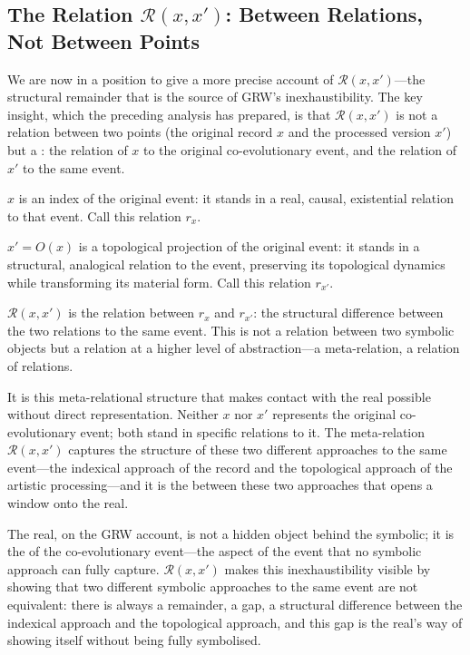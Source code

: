 \subsection{The Relation $\mathcal{R}(x, x')$: Between Relations, Not Between Points}
\label{p15:subsec:relation}

\noindent
We are now in a position to give a more precise account of $\mathcal{R}(x, x')$---the structural remainder that is the source of GRW's inexhaustibility. The key insight, which the preceding analysis has prepared, is that $\mathcal{R}(x, x')$ is not a relation between two points (the original record $x$ and the processed version $x'$) but a : the relation of $x$ to the original co-evolutionary event, and the relation of $x'$ to the same event.

$x$ is an index of the original event: it stands in a real, causal, existential relation to that event. Call this relation $r_x$.

$x' = O(x)$ is a topological projection of the original event: it stands in a structural, analogical relation to the event, preserving its topological dynamics while transforming its material form. Call this relation $r_{x'}$.

$\mathcal{R}(x, x')$ is the relation between $r_x$ and $r_{x'}$: the structural difference between the two relations to the same event. This is not a relation between two symbolic objects but a relation at a higher level of abstraction---a meta-relation, a relation of relations.

It is this meta-relational structure that makes contact with the real possible without direct representation. Neither $x$ nor $x'$ represents the original co-evolutionary event; both stand in specific relations to it. The meta-relation $\mathcal{R}(x, x')$ captures the structure of these two different approaches to the same event---the indexical approach of the record and the topological approach of the artistic processing---and it is the  between these two approaches that opens a window onto the real.

The real, on the GRW account, is not a hidden object behind the symbolic; it is the  of the co-evolutionary event---the aspect of the event that no symbolic approach can fully capture. $\mathcal{R}(x, x')$ makes this inexhaustibility visible by showing that two different symbolic approaches to the same event are not equivalent: there is always a remainder, a gap, a structural difference between the indexical approach and the topological approach, and this gap is the real's way of showing itself without being fully symbolised.

